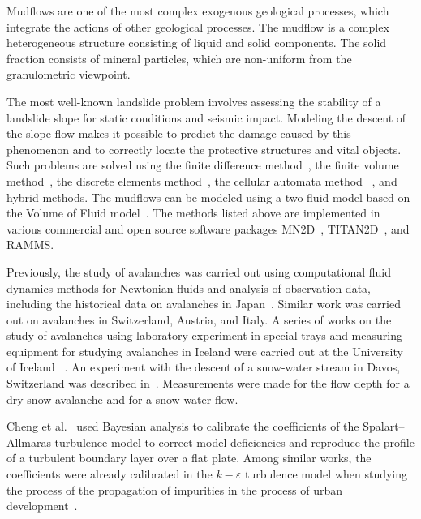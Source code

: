 \documentclass[mathematics,article,accept,pdftex,moreauthors]{Definitions/mdpi}
\begin{document}
Mudflows are one of the most complex exogenous geological processes, which integrate the actions of other geological processes. The mudflow is a complex heterogeneous structure consisting of liquid and solid components. The solid fraction consists of mineral particles, which are non-uniform from the granulometric viewpoint.


The most well-known landslide problem involves assessing the stability of a landslide slope for static conditions and seismic impact. Modeling the descent of the slope flow makes it possible to predict the damage caused by this phenomenon and to correctly locate the protective structures and vital objects. Such problems are solved using the finite difference method~\cite{Bernander2016}, the finite volume method~\cite{liu2007application}, the discrete elements method~\cite{Liu2020}, the cellular automata method ~\cite{piegari2006cellular}, and hybrid methods. The mudflows can be modeled using a two-fluid model based on the Volume of Fluid model~\cite{Hirt1981}. The methods listed above are implemented in various commercial and open source software packages MN2D~\cite{Naaim2002}, TITAN2D~\cite{Pitman2003}, and RAMMS.

Previously, the study of avalanches was carried out using computational fluid dynamics methods for Newtonian fluids and analysis of observation data, including the historical data on avalanches in Japan~\cite{Oda2011, Yamaguchi2017}. Similar work was carried out on avalanches in Switzerland, Austria, and Italy. A series of works on the study of avalanches using laboratory experiment in special trays and measuring equipment for studying avalanches in Iceland were carried out at the University of Iceland ~\cite{IceThesKatr, IceThesJon}. An experiment with the descent of a snow-water stream in Davos, Switzerland was described in~\cite{Jaedicke2006}. Measurements were made for the flow depth for a dry snow avalanche and for a snow-water flow.

Cheng et al.~\cite{Cheung2011} used Bayesian analysis to calibrate the coefficients of the Spalart--Allmaras turbulence model to correct model deficiencies and reproduce the profile of a turbulent boundary layer over a flat plate. Among similar works, the coefficients were already calibrated in the $k-\varepsilon$ turbulence model when studying the process of the propagation of impurities in the process of urban development~\cite{Guillas2014}.
\end{document}
